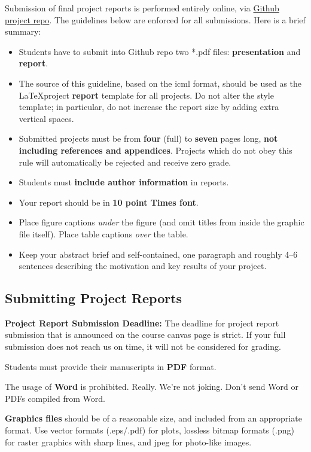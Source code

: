 \documentclass{article}
\begin{document}
Submission of final project reports is performed entirely online, via \href{github.com}{Github project repo}. The guidelines below are enforced for all submissions. Here is a brief summary:
\begin{itemize}
  \item Students have to submit into Github repo two *.pdf files: \textbf{presentation} and \textbf{report}.
  \item The source of this guideline, based on the icml format, should be used as the \LaTeX project \textbf{report} template for all projects. Do not alter the style template; in particular, do not increase the report size by adding extra vertical spaces.
  \item Submitted projects must be from \textbf{four} (full) to \textbf{seven} pages long, \textbf{not including references and appendices}. Projects which do not obey this rule will automatically be rejected and receive zero grade.
  \item Students must \textbf{include author information} in reports.
  \item Your report should be in \textbf{10 point Times font}.
  \item Place figure captions \emph{under} the figure (and omit titles from inside
    the graphic file itself). Place table captions \emph{over} the table.
  \item Keep your abstract brief and self-contained, one paragraph and roughly
    4--6 sentences describing the motivation and key results of your project.
\end{itemize}

\subsection{Submitting Project Reports}

\textbf{Project Report Submission Deadline:} The deadline for project report submission that is announced on the course canvas page is strict. If your full submission does not reach us on time, it will not be
considered for grading.

Students must provide their manuscripts in \textbf{PDF} format.

The usage of \textbf{Word} is prohibited. Really. We're not joking. Don't send Word or PDFs compiled from Word.

\textbf{Graphics files} should be of a reasonable size, and included from
an appropriate format. Use vector formats (.eps/.pdf) for plots,
lossless bitmap formats (.png) for raster graphics with sharp lines, and
jpeg for photo-like images.
\end{document}
